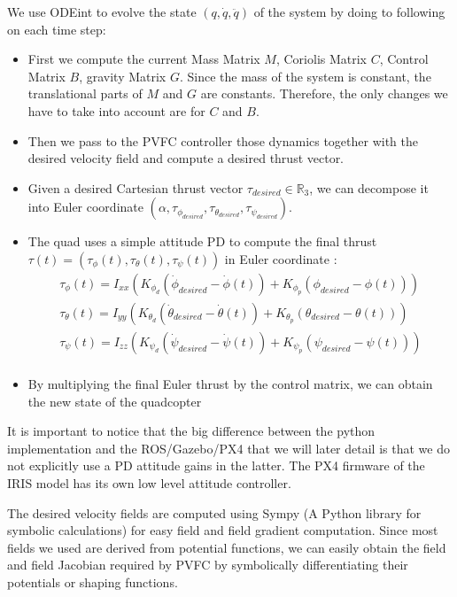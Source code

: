 We use ODEint to evolve the state $(q,\dot{q}, \ddot{q})$ of the system by doing to following on each time step: 
\begin{itemize}
    \item First we compute the current Mass Matrix $M$, Coriolis Matrix $C$, Control Matrix $B$, gravity Matrix $G$. Since the mass of the system is constant, the translational parts of $M$ and $G$ are constants.
    Therefore, the only changes we have to take into account are for $C$ and $B$.
    \item Then we pass to the PVFC controller those dynamics together with the desired velocity field and compute a desired thrust vector.
    \item Given a desired Cartesian thrust vector $\tau_{desired} \in \mathbb{R}_3$, we can decompose it into Euler coordinate $(\alpha, \tau_{\phi_{desired}}, \tau_{\theta_{desired}}, \tau_{\psi_{desired}})$. 
    \item The quad uses a simple attitude PD to compute the final thrust $\tau(t) = (\tau_{{\phi}}(t), \tau_{{\theta}}(t), \tau_{{\psi}}(t)) $ in Euler coordinate :
    \begin{align}
        \tau_{{\phi}}(t) = I_{xx}(K_{\phi_{d}}(\dot{\phi}_{desired} - \dot{\phi}(t))+K_{\phi_{p}}(\phi_{desired} - \phi(t)))\\ \nonumber
        \tau_{{\theta}}(t) = I_{yy}(K_{\theta_{d}}(\dot{\theta}_{desired} - \dot{\theta}(t))+K_{\theta_{p}}(\theta_{desired} - \theta(t)))\\ \nonumber
        \tau_{{\psi}}(t) = I_{zz}(K_{\psi_{d}}(\dot{\psi}_{desired} - \dot{\psi}(t))+K_{\psi_{p}}(\psi_{desired} - \psi(t)))\\ \nonumber
    \end{align}
    \item By multiplying the final Euler thrust by the control matrix, we can obtain the new state of the quadcopter
\end{itemize}
It is important to notice that the big difference between the python implementation and the ROS/Gazebo/PX4 that we will later detail is that we do not explicitly use a PD attitude gains in the latter. 
The PX4 firmware of the IRIS model has its own low level attitude controller.


The desired velocity fields are computed using Sympy (A Python library for symbolic calculations) for easy field and field gradient computation. Since most fields we used are derived from potential functions, we can easily obtain the field and field Jacobian required by PVFC by symbolically differentiating their potentials or shaping functions.

